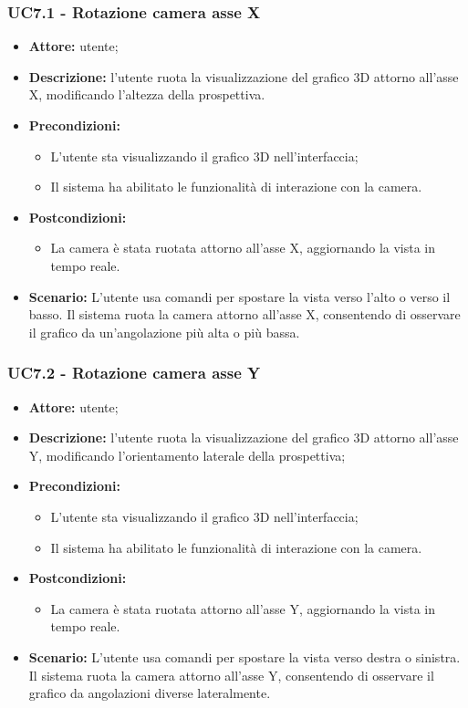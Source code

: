\subsubsection{UC7.1 - Rotazione camera asse X}
\begin{itemize}
    \item \textbf{Attore:} utente;
    \item \textbf{Descrizione:} l'utente ruota la visualizzazione del grafico 3D attorno all'asse X, modificando l'altezza della prospettiva.
    \item \textbf{Precondizioni:} 
    \begin{itemize}
        \item L'utente sta visualizzando il grafico 3D nell'interfaccia;
        \item Il sistema ha abilitato le funzionalità di interazione con la camera.
    \end{itemize}
    \item \textbf{Postcondizioni:} 
    \begin{itemize}
        \item La camera è stata ruotata attorno all'asse X, aggiornando la vista in tempo reale.
    \end{itemize}
    \item \textbf{Scenario:}  
    L'utente usa comandi per spostare la vista verso l'alto o verso il basso. Il sistema ruota la camera attorno all'asse X, consentendo di osservare il grafico da un'angolazione più alta o più bassa.
\end{itemize}
\subsubsection{UC7.2 - Rotazione camera asse Y}
\begin{itemize}
    \item \textbf{Attore:} utente;
    \item \textbf{Descrizione:} l'utente ruota la visualizzazione del grafico 3D attorno all'asse Y, modificando l'orientamento laterale della prospettiva;
    \item \textbf{Precondizioni:} 
    \begin{itemize}
        \item L'utente sta visualizzando il grafico 3D nell'interfaccia;
        \item Il sistema ha abilitato le funzionalità di interazione con la camera.
    \end{itemize}
    \item \textbf{Postcondizioni:} 
    \begin{itemize}
        \item La camera è stata ruotata attorno all'asse Y, aggiornando la vista in tempo reale.
    \end{itemize}
    \item \textbf{Scenario:}  
    L'utente usa comandi per spostare la vista verso destra o sinistra. Il sistema ruota la camera attorno all'asse Y, consentendo di osservare il grafico da angolazioni diverse lateralmente.
\end{itemize}


